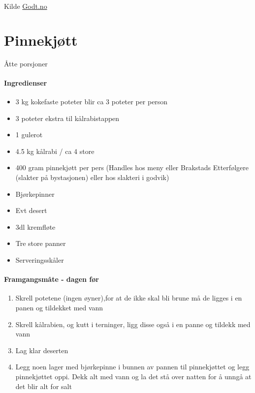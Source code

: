 \documentclass[12pt,a4paper]{book}
\begin{document}
Kilde \href{http://www.godt.no/o2055}{Godt.no}
\clearpage{}
\clearpage{}\section{﻿Pinnekjøtt}
Åtte porsjoner

\paragraph{Ingredienser}
\begin{itemize}[noitemsep]
	\item 3 kg kokefaste poteter blir ca 3 poteter per person
	\item 3 poteter ekstra til kålrabistappen
	\item 1 gulerot
	\item 4.5 kg kålrabi / ca 4 store
	\item 400 gram pinnekjøtt per pers (Handles hos meny eller Brakstads Etterfølgere (slakter på bystasjonen) eller hos slakteri i godvik)
	\item Bjørkepinner
	\item Evt desert
	\item 3dl kremfløte
	\item Tre store panner
	\item Serveringsskåler
\end{itemize}

\paragraph{Framgangsmåte - dagen før}
\begin{enumerate}[noitemsep]
	\item Skrell potetene (ingen øyner),for at de ikke skal bli brune må de ligges i en panen og tildekket med vann
	\item Skrell kålrabien, og kutt i terninger, ligg disse også i en panne og tildekk med vann
	\item Lag klar deserten
	\item Legg noen lager med bjørkepinne i bunnen av pannen til pinnekjøttet og legg pinnekjøttet oppi. Dekk alt med vann og la det stå over natten for å unngå at det blir alt for salt
\end{enumerate}
\end{document}
